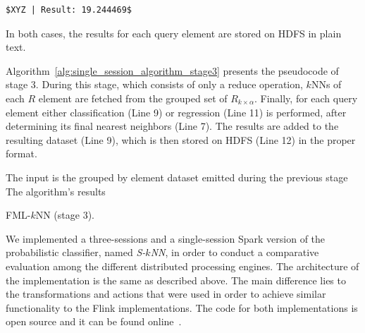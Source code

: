 \begin{lstlisting}[caption={The value estimation of element XYZ.}, label={lst:result2}, mathescape=true]
$XYZ | Result: 19.244469$
\end{lstlisting}

In both cases, the results for each query element are stored on HDFS in plain text.

Algorithm~\ref{alg:single_session_algorithm_stage3} presents the pseudocode of stage 3. During this stage, which consists of only a reduce operation, $k$NNs of each $R$ element are fetched from the grouped set of $R_{k \times \alpha}$. Finally, for each query element either classification (Line 9) or regression (Line 11) is performed, after determining its final nearest neighbors (Line 7). The results are added to the resulting dataset (Line 9), which is then stored on HDFS (Line 12) in the proper format.

\begin{algorithm}[h!]
	\scriptsize
	\DontPrintSemicolon
	\Comment The input is the grouped by element dataset emitted during the previous stage \;
	\Comment The algorithm's results \;
	\BlankLine
	\caption{FML-$k$NN (stage 3).}
	\label{alg:single_session_algorithm_stage3}
\end{algorithm}

\label{par:spark}
We implemented a three-sessions and a single-session Spark version of the probabilistic classifier, named \textit{S-$k$NN}, in order to conduct a comparative evaluation among the different distributed processing engines. The architecture of the implementation is the same as described above. The main difference lies to the transformations and actions that were used in order to achieve similar functionality to the Flink implementations. The code for both implementations is open source and it can be found online~\cite{daiadAlgs}.

